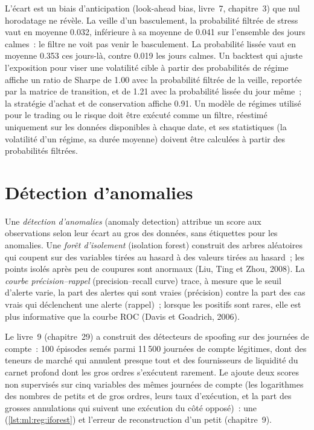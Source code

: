 L'écart est un biais d'anticipation (look-ahead bias, livre~7, chapitre~3) que nul horodatage ne révèle. La veille d'un basculement, la probabilité filtrée
de stress vaut en moyenne 0.032, inférieure à sa moyenne de 0.041 sur l'ensemble des jours calmes~: le filtre ne voit pas venir le basculement. La
probabilité lissée vaut en moyenne 0.353 ces jours-là, contre 0.019 les jours calmes. Un backtest qui ajuste l'exposition pour viser une
volatilité cible à partir des probabilités de régime affiche un ratio de Sharpe de 1.00 avec la probabilité filtrée de la veille, reportée
par la matrice de transition, et de 1.21 avec la probabilité lissée du jour même~; la stratégie d'achat et de conservation affiche 0.91. Un modèle de régimes
utilisé pour le trading ou le risque doit être exécuté comme un filtre, réestimé uniquement sur les données disponibles à chaque date, et ses statistiques
(la volatilité d'un régime, sa durée moyenne) doivent être calculées à partir des probabilités filtrées.

\section{Détection d'anomalies}

\begin{definition}\label{def:ml:clustering-regimes-and-anomaly-detection:anomaly}
Une \emph{détection d'anomalies} (anomaly detection) attribue un score aux observations selon leur écart au gros des données, sans
étiquettes pour les anomalies. Une \emph{forêt d'isolement} (isolation forest) construit des arbres aléatoires qui coupent sur des variables tirées au hasard
à des valeurs tirées au hasard~; les points isolés après peu de coupures sont anormaux (Liu, Ting et Zhou, 2008). La
\emph{courbe précision--rappel} (precision--recall curve) trace, à mesure que le seuil d'alerte varie, la part des alertes qui sont
vraies (précision) contre la part des cas vrais qui déclenchent une alerte (rappel)~; lorsque les positifs sont rares, elle est plus informative
que la courbe ROC (Davis et Goadrich, 2006).
\end{definition}

Le livre~9 (chapitre~29) a construit des détecteurs de spoofing sur des journées de compte~: 100 épisodes semés parmi 11\,500 journées de compte légitimes,
dont des teneurs de marché qui annulent presque tout et des fournisseurs de liquidité du carnet profond dont les gros ordres s'exécutent rarement.
Le  ajoute deux scores non supervisés sur cinq variables des mêmes journées de compte (les logarithmes des nombres de
petits et de gros ordres, leurs taux d'exécution, et la part des grosses annulations qui suivent une exécution du côté opposé)~: une
 (\cref{lst:ml:reg:iforest}) et l'erreur de reconstruction d'un petit  (chapitre~9).

